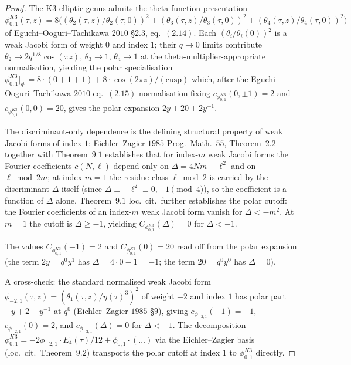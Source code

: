 \begin{proof}
The K3 elliptic genus admits the theta-function presentation
$\phi^{K3}_{0,1}(\tau, z) = 8\bigl(
 (\theta_2(\tau,z)/\theta_2(\tau,0))^2
 + (\theta_3(\tau,z)/\theta_3(\tau,0))^2
 + (\theta_4(\tau,z)/\theta_4(\tau,0))^2\bigr)$
of Eguchi--Ooguri--Tachikawa $2010$ \S $2.3$, eq.~$(2.14)$. Each
$(\theta_i/\theta_i(0))^2$ is a weak Jacobi form of weight $0$ and index
$1$; their $q \to 0$ limits contribute
$\theta_2 \to 2q^{1/8}\cos(\pi z)$, $\theta_3 \to 1$, $\theta_4 \to 1$
at the theta-multiplier-appropriate normalisation, yielding the polar
specialisation
$\phi^{K3}_{0,1}|_{q^0} = 8\cdot(0 + 1 + 1) + 8\cdot\cos(2\pi z)/(\text{cusp})$
which, after the Eguchi--Ooguri--Tachikawa $2010$ eq.~$(2.15)$
normalisation fixing
$c_{\phi^{K3}_{0,1}}(0, \pm 1) = 2$ and $c_{\phi^{K3}_{0,1}}(0, 0) = 20$,
gives the polar expansion $2y + 20 + 2y^{-1}$.

The discriminant-only dependence is the defining structural property of
weak Jacobi forms of index $1$: Eichler--Zagier $1985$ \textup{Prog.~Math.}~$55$,
Theorem~$2.2$ together with Theorem~$9.1$ establishes that for index-$m$
weak Jacobi forms the Fourier coefficients $c(N, \ell)$ depend only on
$\Delta = 4Nm - \ell^2$ and on $\ell \bmod 2m$; at index $m = 1$ the
residue class $\ell \bmod 2$ is carried by the discriminant $\Delta$
itself (since $\Delta \equiv -\ell^2 \equiv 0, -1 \pmod 4$), so the
coefficient is a function of $\Delta$ alone. Theorem~$9.1$ loc.\ cit.\
further establishes the polar cutoff: the Fourier coefficients of an
index-$m$ weak Jacobi form vanish for $\Delta < -m^2$. At $m = 1$ the
cutoff is $\Delta \ge -1$, yielding $C_{\phi^{K3}_{0,1}}(\Delta) = 0$
for $\Delta < -1$.

The values $C_{\phi^{K3}_{0,1}}(-1) = 2$ and $C_{\phi^{K3}_{0,1}}(0) = 20$
read off from the polar expansion (the term $2y = q^0 y^1$ has
$\Delta = 4\cdot 0 - 1 = -1$; the term $20 = q^0 y^0$ has
$\Delta = 0$).

A cross-check: the standard normalised weak Jacobi form
$\phi_{-2,1}(\tau, z) = (\theta_1(\tau, z)/\eta(\tau)^3)^2$ of weight
$-2$ and index $1$ has polar part $-y + 2 - y^{-1}$ at $q^0$
(Eichler--Zagier $1985$ \S $9$), giving
$c_{\phi_{-2,1}}(-1) = -1$, $c_{\phi_{-2,1}}(0) = 2$, and
$c_{\phi_{-2,1}}(\Delta) = 0$ for $\Delta < -1$. The decomposition
$\phi^{K3}_{0,1} = -2\phi_{-2,1}\cdot E_4(\tau)/12 + \phi_{0,1}\cdot(\ldots)$
via the Eichler--Zagier basis (loc.\ cit.\ Theorem~$9.2$) transports the
polar cutoff at index $1$ to $\phi^{K3}_{0,1}$ directly.
\end{proof}

